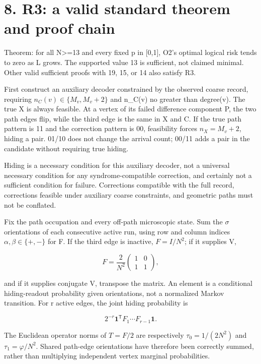 \documentclass[11pt,a4paper]{article}
\begin{document}
\section*{8. R3: a valid standard theorem and proof chain}

Theorem: for all N>=13 and every fixed p in [0,1], O2's optimal logical risk tends to zero as L grows. The supported value 13 is sufficient, not claimed minimal. Other valid sufficient proofs with 19, 15, or 14 also satisfy R3.

First construct an auxiliary decoder constrained by the observed coarse record, requiring \(n_C(v)\in\{M_v,M_v+2\}\) and n\_C(v) no greater than degree(v). The true X is always feasible. At a vertex of its failed difference component P, the two path edges flip, while the third edge is the same in X and C. If the true path pattern is 11 and the correction pattern is 00, feasibility forces \(n_X=M_v+2\), hiding a pair. 01/\allowbreak{}10 does not change the arrival count; 00/\allowbreak{}11 adds a pair in the candidate without requiring true hiding.

Hiding is a necessary condition for this auxiliary decoder, not a universal necessary condition for any syndrome-compatible correction, and certainly not a sufficient condition for failure. Corrections compatible with the full record, corrections feasible under auxiliary coarse constraints, and geometric paths must not be conflated.

Fix the path occupation and every off-path microscopic state. Sum the \(\sigma\) orientations of each consecutive active run, using row and column indices \(\alpha,\beta\in\{+,-\}\) for F. If the third edge is inactive, \(F=I/N^2\); if it supplies V,

\[
F=\frac2{N^2}\begin{pmatrix}1&0\\1&1\end{pmatrix},
\]

and if it supplies conjugate V, transpose the matrix. An element is a conditional hiding-readout probability given orientations, not a normalized Markov transition. For r active edges, the joint hiding probability is

\[
2^{-r}\mathbf1^{\mathsf T}F_1\cdots F_{r-1}\mathbf1.
\]

The Euclidean operator norms of \(T=F/2\) are respectively \(\tau_0=1/(2N^2)\) and \(\tau_1=\varphi/N^2\). Shared path-edge orientations have therefore been correctly summed, rather than multiplying independent vertex marginal probabilities.
\end{document}

